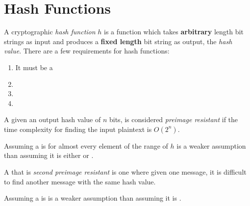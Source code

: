 \section{Hash Functions}\label{sec:Hash_Functions}
\begin{definition}\label{def:Hash_Function}
  A cryptographic \emph{hash function} $h$ is a function which takes \textbf{arbitrary} length bit strings as input and produces a \textbf{fixed length} bit string as output, the \emph{hash value}.
  There are a few requirements for hash functions:
  \begin{enumerate}[noitemsep]
  \item It must be a 
  \item {}
  \item {}
  \item {}
  \end{enumerate}
\end{definition}

\begin{definition}\label{def:Preimage_Resistant}
  A  given an output hash value of $n$ bits, is considered \emph{preimage resistant} if the time complexity for finding the input plaintext is $O(2^{n})$.

  \begin{remark}\label{rmk:Preimage_Resistant_Assumption}
    Assuming a  is  for almost every element of the range of $h$ is a weaker assumption than assuming it is either  or .
  \end{remark}
\end{definition}

\begin{definition}\label{def:Second_Preimage_Resistant}
  A  that is \emph{second preimage resistant} is one where given one message, it is difficult to find another message with the same hash value.

  \begin{remark}\label{rmk:Second_Preimage_Resistant_Assumption}
    Assuming a  is  is a weaker assumption than assuming it is .
  \end{remark}
\end{definition}

